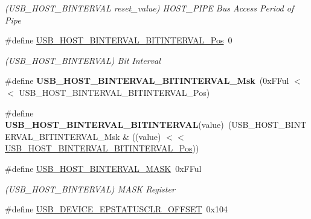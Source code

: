 \begin{DoxyCompactItemize}
\begin{DoxyCompactList}\small\item\em (U\+S\+B\+\_\+\+H\+O\+S\+T\+\_\+\+B\+I\+N\+T\+E\+R\+V\+A\+L reset\+\_\+value) H\+O\+S\+T\+\_\+\+P\+I\+P\+E Bus Access Period of Pipe \end{DoxyCompactList}\item 
\hypertarget{group___s_a_m_l21___u_s_b_ga5149e4d46384831533827f787ac3ea9d}{}\#define \hyperlink{group___s_a_m_l21___u_s_b_ga5149e4d46384831533827f787ac3ea9d}{U\+S\+B\+\_\+\+H\+O\+S\+T\+\_\+\+B\+I\+N\+T\+E\+R\+V\+A\+L\+\_\+\+B\+I\+T\+I\+N\+T\+E\+R\+V\+A\+L\+\_\+\+Pos}~0\label{group___s_a_m_l21___u_s_b_ga5149e4d46384831533827f787ac3ea9d}

\begin{DoxyCompactList}\small\item\em (U\+S\+B\+\_\+\+H\+O\+S\+T\+\_\+\+B\+I\+N\+T\+E\+R\+V\+A\+L) Bit Interval \end{DoxyCompactList}\item 
\hypertarget{group___s_a_m_l21___u_s_b_ga0080b8d95002cf8cf23e68d78d537f1a}{}\#define {\bfseries U\+S\+B\+\_\+\+H\+O\+S\+T\+\_\+\+B\+I\+N\+T\+E\+R\+V\+A\+L\+\_\+\+B\+I\+T\+I\+N\+T\+E\+R\+V\+A\+L\+\_\+\+Msk}~(0x\+F\+Ful $<$$<$ U\+S\+B\+\_\+\+H\+O\+S\+T\+\_\+\+B\+I\+N\+T\+E\+R\+V\+A\+L\+\_\+\+B\+I\+T\+I\+N\+T\+E\+R\+V\+A\+L\+\_\+\+Pos)\label{group___s_a_m_l21___u_s_b_ga0080b8d95002cf8cf23e68d78d537f1a}

\item 
\hypertarget{group___s_a_m_l21___u_s_b_ga653be09e619deeb08b7367fa028d987a}{}\#define {\bfseries U\+S\+B\+\_\+\+H\+O\+S\+T\+\_\+\+B\+I\+N\+T\+E\+R\+V\+A\+L\+\_\+\+B\+I\+T\+I\+N\+T\+E\+R\+V\+A\+L}(value)~(U\+S\+B\+\_\+\+H\+O\+S\+T\+\_\+\+B\+I\+N\+T\+E\+R\+V\+A\+L\+\_\+\+B\+I\+T\+I\+N\+T\+E\+R\+V\+A\+L\+\_\+\+Msk \& ((value) $<$$<$ \hyperlink{group___s_a_m_l21___u_s_b_ga5149e4d46384831533827f787ac3ea9d}{U\+S\+B\+\_\+\+H\+O\+S\+T\+\_\+\+B\+I\+N\+T\+E\+R\+V\+A\+L\+\_\+\+B\+I\+T\+I\+N\+T\+E\+R\+V\+A\+L\+\_\+\+Pos}))\label{group___s_a_m_l21___u_s_b_ga653be09e619deeb08b7367fa028d987a}

\item 
\hypertarget{group___s_a_m_l21___u_s_b_gad98b3dbc4b12f0ae4e0d76a3ab02e9b6}{}\#define \hyperlink{group___s_a_m_l21___u_s_b_gad98b3dbc4b12f0ae4e0d76a3ab02e9b6}{U\+S\+B\+\_\+\+H\+O\+S\+T\+\_\+\+B\+I\+N\+T\+E\+R\+V\+A\+L\+\_\+\+M\+A\+S\+K}~0x\+F\+Ful\label{group___s_a_m_l21___u_s_b_gad98b3dbc4b12f0ae4e0d76a3ab02e9b6}

\begin{DoxyCompactList}\small\item\em (U\+S\+B\+\_\+\+H\+O\+S\+T\+\_\+\+B\+I\+N\+T\+E\+R\+V\+A\+L) M\+A\+S\+K Register \end{DoxyCompactList}\item 
\hypertarget{group___s_a_m_l21___u_s_b_gac4dd855fc2a485937b1826f52b1bffe3}{}\#define \hyperlink{group___s_a_m_l21___u_s_b_gac4dd855fc2a485937b1826f52b1bffe3}{U\+S\+B\+\_\+\+D\+E\+V\+I\+C\+E\+\_\+\+E\+P\+S\+T\+A\+T\+U\+S\+C\+L\+R\+\_\+\+O\+F\+F\+S\+E\+T}~0x104\label{group___s_a_m_l21___u_s_b_gac4dd855fc2a485937b1826f52b1bffe3}


\end{DoxyCompactItemize}
